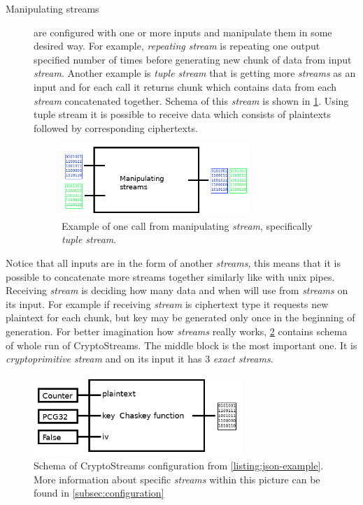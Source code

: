 \documentclass[
    digital,    %
    oneside,    %
    color,
    11pt,
    nocover,
    notable,
    nolof,
    nolot,
    final
]{fithesis3}
\begin{document}
\begin{description}
	\item[Manipulating streams] are configured with one or more inputs and manipulate them in some desired way. For example, \textit{repeating stream} is repeating one output specified number of times before generating new chunk of data from input \textit{stream}. Another example is \textit{tuple stream} that is getting more \textit{streams} as an input and for each call it returns chunk which contains data from each \textit{stream} concatenated together. Schema of this \textit{stream} is shown in \cref{fig:manipulating-stream}. Using tuple stream it is possible to receive data which consists of plaintexts followed by corresponding ciphertexts. 
	\begin{figure}[h]
		\centering
		\includegraphics[width=0.7\textwidth]{./images/pictures/manipulating-stream.png}
		\caption{Example of one call from manipulating \textit{stream}, specifically \textit{tuple stream}. }
		\label{fig:manipulating-stream}
	\end{figure}

\end{description}

Notice that all inputs are in the form of another \textit{streams}, this means that it is possible to concatenate more streams together similarly like with unix pipes. Receiving \textit{stream} is deciding how many data and when will use from \textit{streams} on its input. For example if receiving \textit{stream} is ciphertext type it requests new plaintext for each chunk, but key may be generated only once in the beginning of generation. For better imagination how \textit{streams} really works, \cref{fig:config-schema} contains schema of whole run of CryptoStreams. The middle block is the most important one. It is \textit{cryptoprimitive stream} and on its input it has 3 \textit{exact streams}.

\begin{figure}[h]
	\centering
	\includegraphics[width=0.7\textwidth]{./images/pictures/config-schema.png}
	\caption{Schema of CryptoStreams configuration from \cref{listing:json-example}. More information about specific \textit{streams} within this picture can be found in \cref{subsec:configuration} }
	\label{fig:config-schema}
\end{figure}
\end{document}

